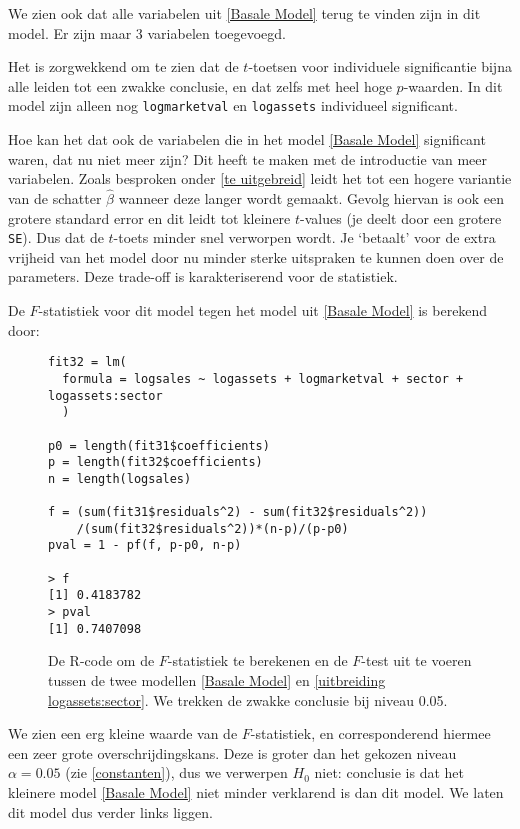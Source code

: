 \documentclass[a4paper]{report}
\begin{document}
  We zien ook dat alle variabelen uit \ref{Basale Model} terug te vinden zijn in dit model. Er zijn maar 3 variabelen toegevoegd.
  
  Het is zorgwekkend om te zien dat de $t$-toetsen voor individuele significantie bijna alle leiden tot een zwakke conclusie, en dat zelfs met heel hoge $p$-waarden. In dit model zijn alleen nog \verb!logmarketval! en \verb!logassets! individueel significant. 
  
  Hoe kan het dat ook de variabelen die in het model \ref{Basale Model} significant waren, dat nu niet meer zijn? Dit heeft te maken met de introductie van meer variabelen. Zoals besproken onder \ref{te uitgebreid} leidt het tot een hogere variantie van de schatter $\hat{\beta}$ wanneer deze langer wordt gemaakt. Gevolg hiervan is ook een grotere standard error en dit leidt tot kleinere $t$-values (je deelt door een grotere \verb!SE!). Dus dat de $t$-toets minder snel verworpen wordt. Je `betaalt' voor de extra vrijheid van het model door nu minder sterke uitspraken te kunnen doen over de parameters. Deze trade-off is karakteriserend voor de statistiek.
  
  De $F$-statistiek voor dit model tegen het model uit \ref{Basale Model} is berekend door:
  \begin{figure}[H]
  \begin{verbatim}
fit32 = lm(
  formula = logsales ~ logassets + logmarketval + sector + logassets:sector
  )

p0 = length(fit31$coefficients)
p = length(fit32$coefficients)
n = length(logsales)

f = (sum(fit31$residuals^2) - sum(fit32$residuals^2))
    /(sum(fit32$residuals^2))*(n-p)/(p-p0)
pval = 1 - pf(f, p-p0, n-p)

> f 
[1] 0.4183782
> pval
[1] 0.7407098
  \end{verbatim}
  \caption{De R-code om de $F$-statistiek te berekenen en de $F$-test uit te voeren tussen de twee modellen \ref{Basale Model} en \ref{uitbreiding logassets:sector}. We trekken de zwakke conclusie bij niveau 0.05.}
  \end{figure}
  
  We zien een erg kleine waarde van de $F$-statistiek, en corresponderend hiermee een zeer grote overschrijdingskans. Deze is groter dan het gekozen niveau $\alpha = 0.05$ (zie \ref{constanten}), dus we verwerpen $H_0$ niet: conclusie is dat het kleinere model \ref{Basale Model} niet minder verklarend is dan dit model. We laten dit model dus verder links liggen.
  
\end{document}
